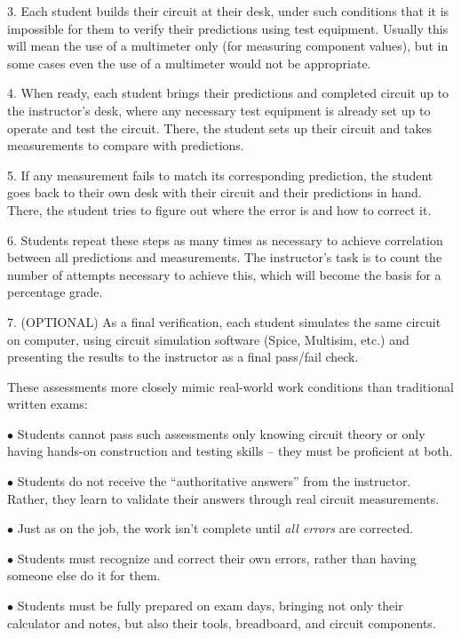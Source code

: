 \item{3.} Each student builds their circuit at their desk, under such conditions that it is impossible for them to verify their predictions using test equipment.  Usually this will mean the use of a multimeter only (for measuring component values), but in some cases even the use of a multimeter would not be appropriate.

\item{4.} When ready, each student brings their predictions and completed circuit up to the instructor's desk, where any necessary test equipment is already set up to operate and test the circuit.  There, the student sets up their circuit and takes measurements to compare with predictions.

\item{5.} If any measurement fails to match its corresponding prediction, the student goes back to their own desk with their circuit and their predictions in hand.  There, the student tries to figure out where the error is and how to correct it.

\item{6.} Students repeat these steps as many times as necessary to achieve correlation between all predictions and measurements.  The instructor's task is to count the number of attempts necessary to achieve this, which will become the basis for a percentage grade.

\item{7.} (OPTIONAL) As a final verification, each student simulates the same circuit on computer, using circuit simulation software (Spice, Multisim, etc.) and presenting the results to the instructor as a final pass/fail check.

\vskip 10pt

\noindent
These assessments more closely mimic real-world work conditions than traditional written exams:

\medskip
\item{$\bullet$} Students cannot pass such assessments only knowing circuit theory or only having hands-on construction and testing skills -- they must be proficient at both.
\item{$\bullet$} Students do not receive the ``authoritative answers'' from the instructor.  Rather, they learn to validate their answers through real circuit measurements.
\item{$\bullet$} Just as on the job, the work isn't complete until {\it all errors} are corrected.
\item{$\bullet$} Students must recognize and correct their own errors, rather than having someone else do it for them.
\item{$\bullet$} Students must be fully prepared on exam days, bringing not only their calculator and notes, but also their tools, breadboard, and circuit components.
\medskip

